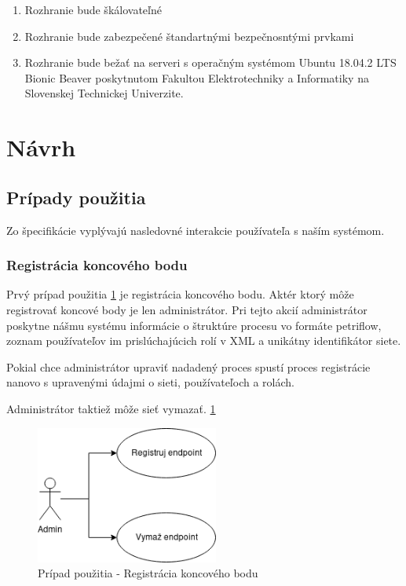 \begin{enumerate} 
    \item Rozhranie bude škálovateľné 
     
    \item Rozhranie bude zabezpečené štandartnými bezpečnosntými prvkami
    
    \item Rozhranie bude bežať na serveri s operačným systémom Ubuntu 18.04.2 LTS Bionic Beaver poskytnutom Fakultou Elektrotechniky a Informatiky na Slovenskej Technickej Univerzite.  
\end{enumerate} 

  

\section{Návrh} 



 

\subsection{Prípady použitia}
Zo špecifikácie vyplývajú nasledovné interakcie používateľa s naším systémom.

\subsubsection{Registrácia koncového bodu}
Prvý prípad použitia \ref{usecase1} je registrácia koncového bodu. Aktér ktorý môže registrovať koncové body je len administrátor. Pri tejto akcií administrátor poskytne nášmu systému informácie o štruktúre procesu vo formáte petriflow, zoznam používateľov im prislúchajúcich rolí v XML a unikátny identifikátor siete. 

Pokial chce administrátor upraviť nadadený proces spustí proces registrácie nanovo s upravenými údajmi o sieti, používateľoch a rolách.

Administrátor taktiež môže sieť vymazať. \ref{usecase1}
\begin{figure}[!htbp]
	\centering
	\includegraphics[width=6cm]{img/dp_usecase_1_register.png}
	\caption{Prípad použitia - Registrácia koncového bodu}
	\label{usecase1}
\end{figure} 

